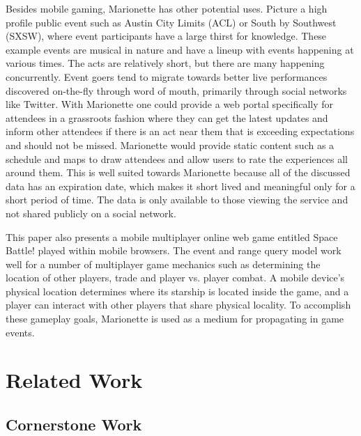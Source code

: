 \documentclass[12pt]{report}	%
\theoremstyle{definition}
\theoremstyle{remark}
\begin{document}
Besides mobile gaming, Marionette has other potential uses. Picture a
high profile public event such as Austin City Limits (ACL) or South by
Southwest (SXSW), where event participants have a large thirst for
knowledge. These example events are musical in nature and have a lineup
with events happening at various times. The acts are relatively short,
but there are many happening concurrently. Event goers tend to migrate
towards better live performances discovered on-the-fly through word of mouth,
primarily through social networks like Twitter. With Marionette one
could provide a web portal specifically for attendees in a grassroots
fashion where they can get the latest updates and inform other attendees
if there is an act near them that is exceeding expectations and should
not be missed. Marionette would provide static content such as a
schedule and maps to draw attendees and allow users to rate the
experiences all around them. This is well suited towards Marionette
because all of the discussed data has an expiration date, which makes it
short lived and meaningful only for a short period of time. The data is
only available to those viewing the service and not shared publicly on a
social network.

This paper also presents a mobile multiplayer online web game entitled
Space Battle! played within mobile browsers. The event and range query
model work well for a number of multiplayer game mechanics such as
determining the location of other players, trade and player vs. player
combat. A mobile device's physical location determines where its
starship is located inside the game, and a player can interact with other players
that share physical locality. To accomplish these gameplay
goals, Marionette is used as a medium for propagating in game events.

\chapter{Related Work}

\section{Cornerstone Work}
\end{document}
